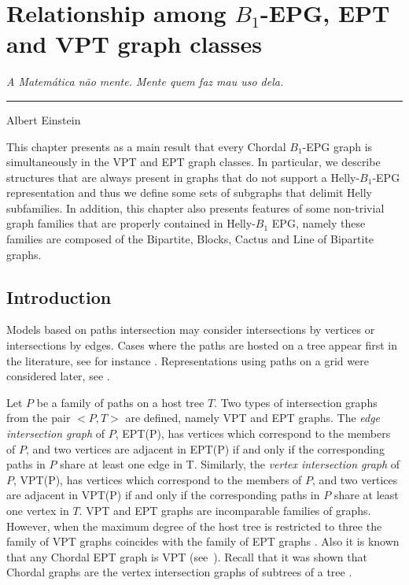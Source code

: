 \chapter{Relationship among  $B_1$-EPG, EPT and VPT graph classes}
\label{cap:v}

\begin{flushright}
\begin{minipage}[t][0cm][b]{0.47\textwidth}
\emph{
A Matemática não mente. Mente quem faz mau uso dela.}
\end{minipage}

\rule[0cm]{7cm}{0.03cm}%

Albert Einstein
\end{flushright}

This chapter presents as a main result that every Chordal $B_1$-EPG graph is simultaneously in the VPT and EPT graph classes. In particular, we describe structures that are always present in graphs that do not support a Helly-$B_1$-EPG representation and thus we define some sets of subgraphs that delimit Helly subfamilies. 
 In addition, this chapter also presents features of some non-trivial graph families that are properly contained in Helly-$B_1$ EPG, namely these families are composed of the Bipartite, Blocks, Cactus and Line of Bipartite  graphs.



\section{Introduction}

Models based on paths intersection  may consider  intersections by vertices or   intersections by edges.  Cases where the paths are hosted on a tree  appear first in the literature, see for instance \cite{gavril1978recognition, golumbic1985edge, golumbic1985}.  Representations using paths on a grid were considered later, see  \cite{golumbic2009,golumbic2013, golumbic2013intersection}. %

 Let $P$ be a family of paths on a host tree $T$. Two types of intersection graphs from the pair $<P,T>$ are defined, namely VPT and EPT graphs.
The \textit{edge intersection graph} of $P$, EPT(P), has vertices which correspond to the members of $P$, and two vertices are adjacent in EPT(P) if and only if the corresponding paths in $P$ share at least one edge in T. Similarly, the \textit{vertex intersection graph} of $P$, VPT(P), has vertices which correspond to the members of $P$, and two vertices are adjacent in VPT(P) if and only if the corresponding paths in $P$ share at least one vertex in $T$.
%
VPT and EPT graphs are incomparable families of graphs. However, when the maximum degree of the host tree is restricted to three the family of
VPT graphs coincides with the family of EPT graphs \cite{golumbic1985edge%
}. Also it is known that any Chordal EPT graph is VPT (see~\cite{syslo1985triangulated}). Recall that it was shown that Chordal graphs are the vertex intersection graphs of subtrees of a tree \cite{gavril1974intersection}.


